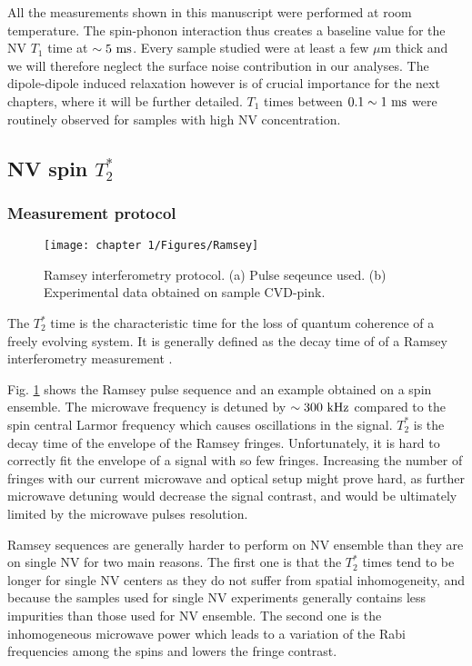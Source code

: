 \documentclass[a4paper, 11pt]{book}
\begin{document}
All the measurements shown in this manuscript were performed at room temperature. The spin-phonon interaction thus creates a baseline value for the NV $T_1$ time at $\sim 5\ \rm ms$. Every sample studied were at least a few $\mu$m thick and we will therefore neglect the surface noise contribution in our analyses. The dipole-dipole induced relaxation however is of crucial importance for the next chapters, where it will be further detailed. $T_1$ times between $0.1 \sim 1\ \rm ms$ were routinely observed for samples with high NV concentration.

\subsection{NV spin $T_2^*$}
\subsubsection{Measurement protocol}
\begin{figure}[h!]
\centering
\texttt{[image: chapter 1/Figures/Ramsey]}
\caption{Ramsey interferometry protocol. (a) Pulse seqeunce used. (b) Experimental data obtained on sample CVD-pink.} %
\label{Ramsey}
\end{figure}

The $T_2^*$ time is the characteristic time for the loss of quantum coherence of a freely evolving system. It is generally defined as the decay time of of a Ramsey interferometry measurement \citep{barry2020sensitivity}.

Fig. \ref{Ramsey} shows the Ramsey pulse sequence and an  example obtained on a spin ensemble. The microwave frequency is detuned by $\sim 300\ \rm kHz$ compared to the spin central Larmor frequency which causes oscillations in the signal. $T_2^*$ is the decay time of the envelope of the Ramsey fringes. Unfortunately, it is hard to correctly fit the envelope of a signal with so few fringes. Increasing the number of fringes with our current microwave and optical setup might prove hard, as further microwave detuning would decrease the signal contrast, and would be ultimately limited by the microwave pulses resolution.

Ramsey sequences are generally harder to perform on NV ensemble than they are on single NV for two main reasons. The first one is that the $T_2^*$ times tend to be longer for single NV centers as they do not suffer from spatial inhomogeneity, and because the samples used for single NV experiments generally contains less impurities than those used for NV ensemble. The second one is the inhomogeneous microwave power which leads to a variation of the Rabi frequencies among the spins \citep{barry2016optical, zhou2020quantum} and lowers the fringe contrast.
\end{document}
